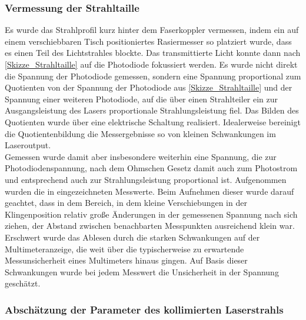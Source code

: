 \documentclass[11pt,a4paper,oneside]{scrartcl}
\begin{document}
\subsubsection{Vermessung der Strahltaille}\label{Durchführung Vermessung der Strahltaille}
Es wurde das Strahlprofil kurz hinter dem Faserkoppler vermessen, indem ein auf einem verschiebbaren Tisch positioniertes Rasiermesser so platziert wurde, dass es einen Teil des Lichtstrahles blockte. Das transmittierte Licht konnte dann nach \ref{Skizze_Strahltaille} auf die Photodiode fokussiert werden. Es wurde nicht direkt die Spannung der Photodiode gemessen, sondern eine Spannung proportional zum Quotienten von der Spannung der Photodiode aus \ref{Skizze_Strahltaille} und der Spannung einer weiteren Photodiode, auf die über einen Strahlteiler ein zur Ausgangsleistung des Lasers proportionale Strahlungsleistung fiel. Das Bilden des Quotienten wurde über eine elektrische Schaltung realisiert. Idealerweise bereinigt die Quotientenbildung die Messergebnisse so von kleinen Schwankungen im Laseroutput.\\
Gemessen wurde damit aber insbesondere weiterhin eine Spannung, die zur Photodiodenspannung, nach dem Ohmschen Gesetz damit auch zum Photostrom und entsprechend auch zur Strahlungsleistung proportional ist. Aufgenommen wurden die in  eingezeichneten Messwerte. Beim Aufnehmen dieser wurde darauf geachtet, dass in dem Bereich, in dem kleine Verschiebungen in der Klingenposition relativ große Änderungen in der gemessenen Spannung nach sich ziehen, der Abstand zwischen benachbarten Messpunkten ausreichend klein war. Erschwert wurde das Ablesen durch die starken Schwankungen auf der Multimeteranzeige, die weit über die typischerweise zu erwartende Messunsicherheit eines Multimeters hinaus gingen. Auf Basis dieser Schwankungen wurde bei jedem Messwert die Unsicherheit in der Spannung geschätzt.
\subsubsection{Abschätzung der Parameter des kollimierten Laserstrahls}
\end{document}
